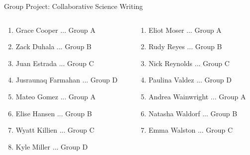 \documentclass{beamer}
\begin{document}
\begin{frame}{Group Project: Collaborative Science Writing}
\small
\begin{columns}[T]
\begin{column}{0.5\textwidth}
\begin{enumerate}
\item Grace	Cooper ... Group A
\item Zack	Duhala ... Group B
\item Juan	Estrada ... Group C
\item Jusraunaq	Farmahan ... Group D
\item Mateo	Gomez ... Group A
\item Elise	Hansen ... Group B
\item Wyatt	Killien ... Group C
\item Kyle	Miller ... Group D
\end{enumerate}
\end{column}
\begin{column}{0.5\textwidth}
\begin{enumerate}
\item Eliot	Moser ... Group A
\item Rudy	Reyes ... Group B
\item Nick	Reynolds ... Group C
\item Paulina Valdez ... Group D
\item Andrea Wainwright ... Group A
\item Natasha Waldorf ... Group B
\item Emma Walston ... Group C
\end{enumerate}
\end{column}
\end{columns}
\end{frame}
\end{document}
